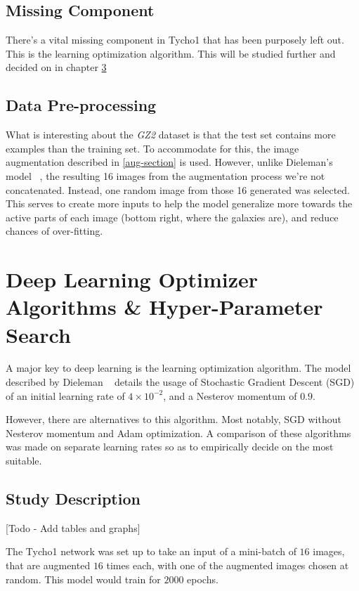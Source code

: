 \documentclass[12pt,a4paper,oneside,oldfontcommands]{memoir}
\begin{document}
\section{Missing Component}
There's a vital missing component in Tycho1 that has been purposely left out. This is the learning optimization algorithm. This will be studied further and decided on in chapter \ref{study}

\section{Data Pre-processing}

What is interesting about the \textit{GZ2} dataset is that the test set contains more examples than the training set. To accommodate for this, the image augmentation described in \ref{aug-section} is used. However, unlike Dieleman's model ~\cite{Sanders-GZ}, the resulting 16 images from the augmentation process we’re not concatenated. Instead, one random image from those 16 generated was selected. This serves to create more inputs to help the model generalize more towards the active parts of each image (bottom right, where the galaxies are), and reduce chances of over-fitting. 

\chapter{Deep Learning Optimizer Algorithms \& Hyper-Parameter Search} \label{study}

A major key to deep learning is the learning optimization algorithm. The model described by Dieleman ~\cite{Sanders-GZ} details the usage of Stochastic Gradient Descent (SGD) of an initial learning rate of \(4\times10^{-2}\), and a Nesterov momentum of \(0.9\). 

However, there are alternatives to this algorithm. Most notably, SGD without Nesterov momentum and Adam optimization. A comparison of these algorithms was made on separate learning rates so as to empirically decide on the most suitable.

\section{Study Description}

[Todo - Add tables and graphs]

The Tycho1 network was set up to take an input of a mini-batch of \(16\) images, that are augmented \(16\) times each, with one of the augmented images chosen at random. This model would train for \(2000\) epochs. 
\end{document}
